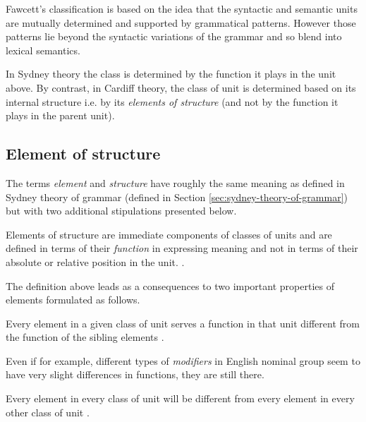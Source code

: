 Fawcett's classification is based on the idea that the syntactic and semantic units are mutually determined and supported by grammatical patterns. However those patterns lie beyond the syntactic variations of the grammar and so blend into lexical semantics.

In Sydney theory the class is determined by the function it plays in the unit above. By contrast, in Cardiff theory, the class of unit is determined based on its internal structure i.e. by its \textit{elements of structure} (and not by the function it plays in the parent unit).  

\subsection{Element of structure}
\label{sec:elements-of-structure}

The terms \textit{element} and \textit{structure} have roughly the same meaning as defined in Sydney theory of grammar (defined in Section \ref{sec:sydney-theory-of-grammar}) but with two additional stipulations presented below.

\begin{definition}\label{def:elementStructure}
	Elements of structure are immediate components of classes of units and are defined in terms of their \textit{function} in expressing meaning and not in terms of their absolute or relative position in the unit. \citep[213--214]{Fawcett2000}. 
\end{definition}

The definition above leads as a consequences to two important properties of elements formulated as follows.

\begin{generalization}
Every element in a given class of unit serves a function in that unit different from the function of the sibling elements \citep[214]{Fawcett2000}. 
\end{generalization} 

Even if for example, different types of \textit{modifiers} in English nominal group seem to have very slight differences in functions, they are still there.

\begin{generalization}
    Every element in every class of unit will be different from every element in every other class of unit \citep[214]{Fawcett2000}. 
\end{generalization} 

